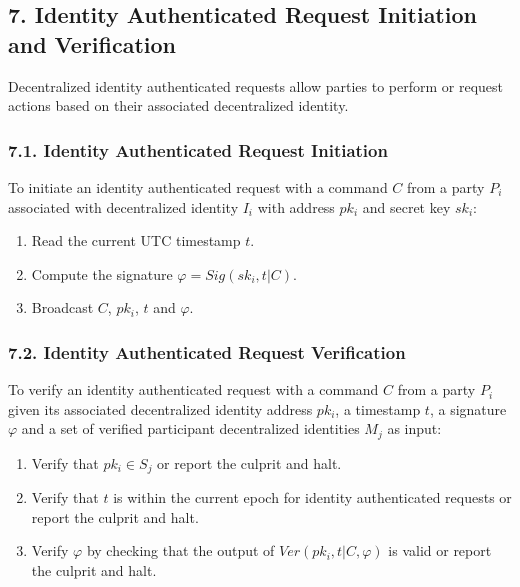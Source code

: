 \documentclass[
]{article}
\providecommand{\tightlist}{%
  \setlength{\itemsep}{0pt}\setlength{\parskip}{0pt}}
\begin{document}
\hypertarget{decentralized-identity-request}{%
\subsection{7. Identity Authenticated Request Initiation and
Verification}\label{decentralized-identity-request}}

Decentralized identity authenticated requests allow parties to perform
or request actions based on their associated decentralized identity.

\hypertarget{identity-authed-request-initiation}{%
\subsubsection{7.1. Identity Authenticated Request
Initiation}\label{identity-authed-request-initiation}}

To initiate an identity authenticated request with a command \(C\) from
a party \(P_i\) associated with decentralized identity \(I_i\) with
address \(pk_i\) and secret key \(sk_i\):

\begin{enumerate}
\def\labelenumi{\arabic{enumi}.}
\tightlist
\item
  Read the current UTC timestamp \(t\).
\item
  Compute the signature \(\varphi = Sig(sk_i, t | C)\).
\item
  Broadcast \(C\), \(pk_i\), \(t\) and \(\varphi\).
\end{enumerate}

\hypertarget{identity-authed-request-verification}{%
\subsubsection{7.2. Identity Authenticated Request
Verification}\label{identity-authed-request-verification}}

To verify an identity authenticated request with a command \(C\) from a
party \(P_i\) given its associated decentralized identity address
\(pk_i\), a timestamp \(t\), a signature \(\varphi\) and a set of
verified participant decentralized identities \(M_j\) as input:

\begin{enumerate}
\def\labelenumi{\arabic{enumi}.}
\tightlist
\item
  Verify that \(pk_i \in S_j\) or report the culprit and halt.
\item
  Verify that \(t\) is within the current epoch for identity
  authenticated requests or report the culprit and halt.
\item
  Verify \(\varphi\) by checking that the output of
  \(Ver(pk_i, t | C, \varphi)\) is valid or report the culprit and halt.
\end{enumerate}
\end{document}
